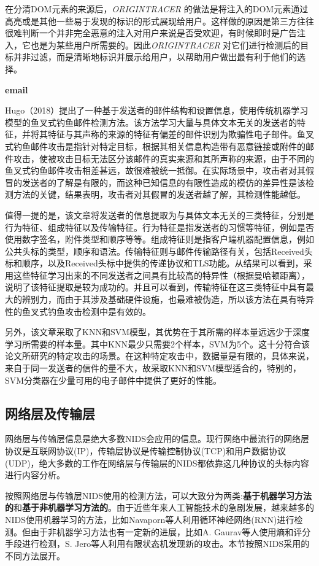 \documentclass[12pt]{article} %
\begin{document}
在分清DOM元素的来源后，\textit{ORIGINTRACER} 的做法是将注入的DOM元素通过高亮或是其他一些易于发现的标识的形式展现给用户。这样做的原因是第三方往往很难判断一个并非完全恶意的注入对用户来说是否受欢迎，有时候即时是广告注入，它也是为某些用户所需要的。因此\textit{ORIGINTRACER} 对它们进行检测后的目标并非过滤，而是清晰地标识并展示给用户，以帮助用户做出最有利于他们的选择。

\textbf{email}

Hugo（2018）提出了一种基于发送者的邮件结构和设置信息，使用传统机器学习模型的鱼叉式钓鱼邮件检测方法。该方法学习大量与具体文本无关的发送者的特征，并将其特征与其声称的来源的特征有偏差的邮件识别为欺骗性电子邮件。鱼叉式钓鱼邮件攻击是指针对特定目标，根据其相关信息构造带有恶意链接或附件的邮件攻击，使被攻击目标无法区分该邮件的真实来源和其所声称的来源，由于不同的鱼叉式钓鱼邮件攻击相差甚远，故很难被统一抵御。在实际场景中，攻击者对其假冒的发送者的了解是有限的，而这种已知信息的有限性造成的模仿的差异性是该检测方法的关键，结果表明，攻击者对其假冒的发送者越了解，其检测性能越低。

值得一提的是，该文章将发送者的信息提取为与具体文本无关的三类特征，分别是行为特征、组成特征以及传输特征。行为特征是指发送者的习惯等特征，例如是否使用数字签名，附件类型和顺序等等。组成特征则是指客户端机器配置信息，例如公共头标的类型，顺序和语法。传输特征则与邮件传输路径有关，包括Received头标和顺序，以及Received头标中提供的传递协议和TLS功能。从结果可以看到，采用这些特征学习出来的不同发送者之间具有比较高的特异性（根据曼哈顿距离），说明了该特征提取是较为成功的。并且可以看到，传输特征在这三类特征中具有最大的辨别力，而由于其涉及基础硬件设施，也最难被伪造，所以该方法在具有特异性的鱼叉式钓鱼攻击检测中是有效的。

另外，该文章采取了KNN和SVM模型，其优势在于其所需的样本量远远少于深度学习所需要的样本量。其中KNN最少只需要2个样本，SVM为5个。这十分符合该论文所研究的特定攻击的场景。在这种特定攻击中，数据量是有限的，具体来说，来自于同一发送者的信件的量不大，故采取KNN和SVM模型适合的，特别的，SVM分类器在少量可用的电子邮件中提供了更好的性能。

\subsection{网络层及传输层}
\label{ip}

网络层与传输层信息是绝大多数NIDS会应用的信息。现行网络中最流行的网络层协议是互联网协议(IP)，传输层协议是传输控制协议(TCP)和用户数据协议(UDP)，绝大多数的工作在网络层与传输层的NIDS都依靠这几种协议的头标内容进行内容分析。

按照网络层与传输层NIDS使用的检测方法，可以大致分为两类:\textbf{基于机器学习方法的}和\textbf{基于非机器学习方法的}。由于近些年来人工智能技术的急剧发展，越来越多的NIDS使用机器学习的方法，比如Navaporn等人利用循环神经网络(RNN)进行检测。但由于非机器学习方法也有一定新的进展，比如A. Gaurav等人使用熵和评分手段进行检测，S. Jero等人利用有限状态机发现新的攻击。本节按照NIDS采用的不同方法展开。
\end{document}
